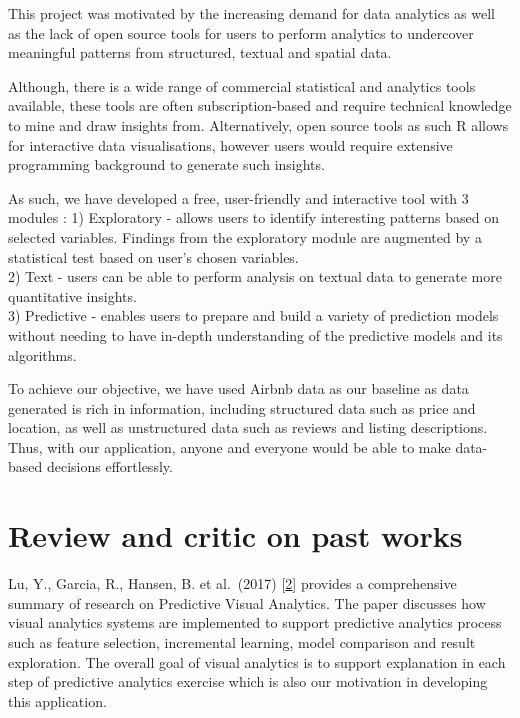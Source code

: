 \documentclass{acm_proc_article-sp}
\begin{document}
This project was motivated by the increasing demand for data analytics
as well as the lack of open source tools for users to perform analytics
to undercover meaningful patterns from structured, textual and spatial
data.

Although, there is a wide range of commercial statistical and analytics
tools available, these tools are often subscription-based and require
technical knowledge to mine and draw insights from. Alternatively, open
source tools as such R allows for interactive data visualisations,
however users would require extensive programming background to generate
such insights.

As such, we have developed a free, user-friendly and interactive tool
with 3 modules : 1) Exploratory - allows users to identify interesting
patterns based on selected variables. Findings from the exploratory
module are augmented by a statistical test based on user's chosen
variables.\\
2) Text - users can be able to perform analysis on textual data to
generate more quantitative insights.\\
3) Predictive - enables users to prepare and build a variety of
prediction models without needing to have in-depth understanding of the
predictive models and its algorithms.

To achieve our objective, we have used Airbnb data as our baseline as
data generated is rich in information, including structured data such as
price and location, as well as unstructured data such as reviews and
listing descriptions. Thus, with our application, anyone and everyone
would be able to make data-based decisions effortlessly.

\hypertarget{review-and-critic-on-past-works}{%
\section{Review and critic on past
works}\label{review-and-critic-on-past-works}}

Lu, Y., Garcia, R., Hansen, B. et al.~(2017)
{[}\protect\hyperlink{ref-https:ux2fux2fdoi.orgux2f10.1111ux2fcgf.13210}{2}{]}
provides a comprehensive summary of research on Predictive Visual
Analytics. The paper discusses how visual analytics systems are
implemented to support predictive analytics process such as feature
selection, incremental learning, model comparison and result
exploration. The overall goal of visual analytics is to support
explanation in each step of predictive analytics exercise which is also
our motivation in developing this application.
\end{document}
